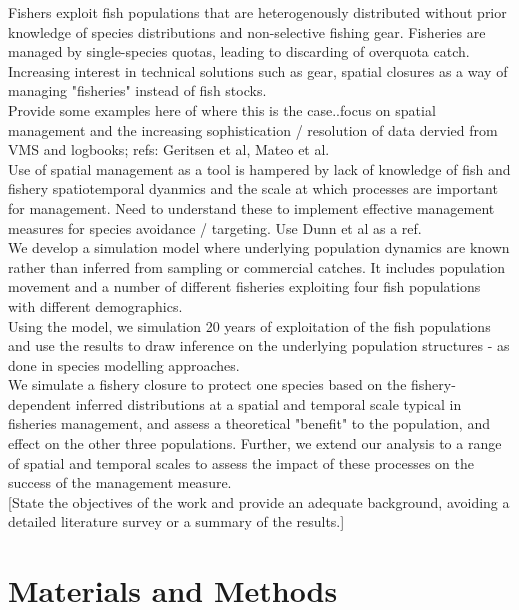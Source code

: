 \documentclass[review]{elsarticle}
\begin{document}
Fishers exploit fish populations that are heterogenously distributed without
prior knowledge of species distributions and non-selective fishing gear.
Fisheries are managed by single-species quotas, leading to discarding of
overquota catch. Increasing interest in technical solutions such as gear,
spatial closures as a way of managing "fisheries" instead of fish stocks. \\

Provide some examples here of where this is the case..focus on spatial
management and the increasing sophistication / resolution of data dervied from
VMS and logbooks; refs: Geritsen et al, Mateo et al. \\ 

Use of spatial management as a tool is hampered by lack of knowledge of fish
and fishery spatiotemporal dyanmics and the scale at which processes are
important for management. Need to understand these to implement effective
management measures for species avoidance / targeting. Use Dunn et al as a
ref.\\

We develop a simulation model where underlying population dynamics are known
rather than inferred from sampling or commercial catches. It includes
population movement and a number of different fisheries exploiting four fish
populations with different demographics.\\

Using the model, we simulation 20 years of exploitation of the fish populations
and use the results to draw inference on the underlying population structures -
as done in species modelling approaches. \\

We simulate a fishery closure to protect one species based on the
fishery-dependent inferred distributions at a spatial and temporal scale
typical in fisheries management, and assess a theoretical "benefit" to the
population, and effect on the other three populations. Further, we extend our
analysis to a range of spatial and temporal scales to assess the impact of
these processes on the success of the management measure. \\

[State the objectives of the work and provide an adequate background, avoiding a
detailed literature survey or a summary of the results.]

\section{Materials and Methods}
\end{document}
